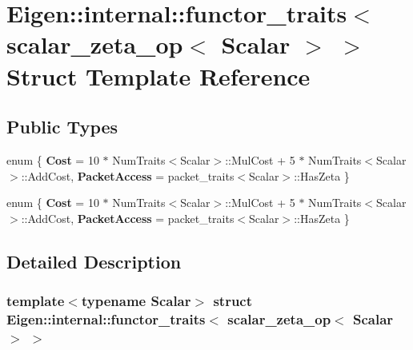 \hypertarget{struct_eigen_1_1internal_1_1functor__traits_3_01scalar__zeta__op_3_01_scalar_01_4_01_4}{}\section{Eigen\+:\+:internal\+:\+:functor\+\_\+traits$<$ scalar\+\_\+zeta\+\_\+op$<$ Scalar $>$ $>$ Struct Template Reference}
\label{struct_eigen_1_1internal_1_1functor__traits_3_01scalar__zeta__op_3_01_scalar_01_4_01_4}
\subsection*{Public Types}
\begin{DoxyCompactItemize}
\item 
\mbox{\label{struct_eigen_1_1internal_1_1functor__traits_3_01scalar__zeta__op_3_01_scalar_01_4_01_4_a8f0bba479ff23e1da52b6e360350e216}} 
enum \{ {\bfseries Cost} = 10 $\ast$ Num\+Traits$<$Scalar$>$\+:\+:Mul\+Cost + 5 $\ast$ Num\+Traits$<$Scalar$>$\+:\+:Add\+Cost, 
{\bfseries Packet\+Access} = packet\+\_\+traits$<$Scalar$>$\+:\+:Has\+Zeta
 \}
\item 
\mbox{\label{struct_eigen_1_1internal_1_1functor__traits_3_01scalar__zeta__op_3_01_scalar_01_4_01_4_a0caea6c30801e84717fddfaa8643ba4c}} 
enum \{ {\bfseries Cost} = 10 $\ast$ Num\+Traits$<$Scalar$>$\+:\+:Mul\+Cost + 5 $\ast$ Num\+Traits$<$Scalar$>$\+:\+:Add\+Cost, 
{\bfseries Packet\+Access} = packet\+\_\+traits$<$Scalar$>$\+:\+:Has\+Zeta
 \}
\end{DoxyCompactItemize}


\subsection{Detailed Description}
\subsubsection*{template$<$typename Scalar$>$\newline
struct Eigen\+::internal\+::functor\+\_\+traits$<$ scalar\+\_\+zeta\+\_\+op$<$ Scalar $>$ $>$}



